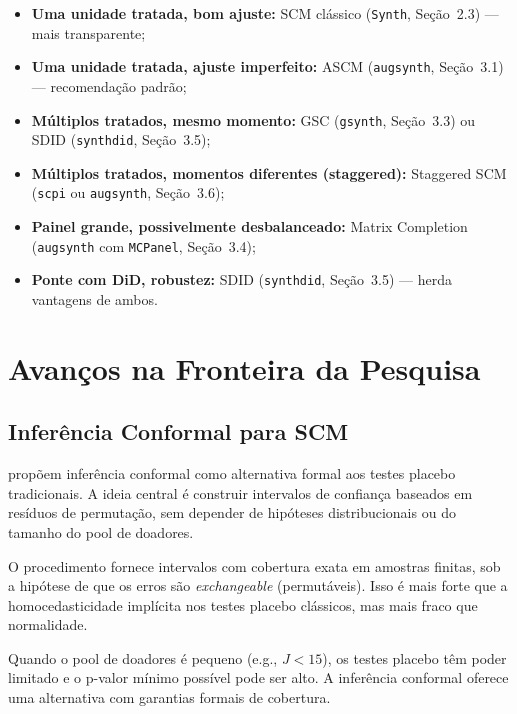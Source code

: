 \documentclass[12pt, a4paper, openany]{book}
\begin{document}
\begin{notabox}
\begin{itemize}[leftmargin=1.5cm]
  \item \textbf{Uma unidade tratada, bom ajuste:} SCM clássico (\texttt{Synth}, Seção~2.3) --- mais transparente;
  \item \textbf{Uma unidade tratada, ajuste imperfeito:} ASCM (\texttt{augsynth}, Seção~3.1) --- recomendação padrão;
  \item \textbf{Múltiplos tratados, mesmo momento:} GSC (\texttt{gsynth}, Seção~3.3) ou SDID (\texttt{synthdid}, Seção~3.5);
  \item \textbf{Múltiplos tratados, momentos diferentes (staggered):} Staggered SCM (\texttt{scpi} ou \texttt{augsynth}, Seção~3.6);
  \item \textbf{Painel grande, possivelmente desbalanceado:} Matrix Completion (\texttt{augsynth} com \texttt{MCPanel}, Seção~3.4);
  \item \textbf{Ponte com DiD, robustez:} SDID (\texttt{synthdid}, Seção~3.5) --- herda vantagens de ambos.
\end{itemize}
\end{notabox}


\newpage
\chapter{Avanços na Fronteira da Pesquisa}

\section{Inferência Conformal para SCM}

\cite{ChernozhukovEtAl2021} propõem inferência conformal como alternativa formal aos testes placebo tradicionais. A ideia central é construir intervalos de confiança baseados em resíduos de permutação, sem depender de hipóteses distribucionais ou do tamanho do pool de doadores.

O procedimento fornece intervalos com cobertura exata em amostras finitas, sob a hipótese de que os erros são \textit{exchangeable} (permutáveis). Isso é mais forte que a homocedasticidade implícita nos testes placebo clássicos, mas mais fraco que normalidade.

\begin{notabox}
Quando o pool de doadores é pequeno (e.g., $J < 15$), os testes placebo têm poder limitado e o p-valor mínimo possível pode ser alto. A inferência conformal oferece uma alternativa com garantias formais de cobertura.
\end{notabox}
\end{document}
